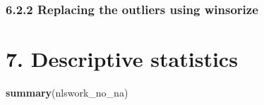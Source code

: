 \documentclass[
]{article}
\newenvironment{Shaded}{\begin{snugshade}}{\end{snugshade}}
\newcommand{\AttributeTok}[1]{\textcolor[rgb]{0.13,0.29,0.53}{#1}}
\newcommand{\DecValTok}[1]{\textcolor[rgb]{0.00,0.00,0.81}{#1}}
\newcommand{\FloatTok}[1]{\textcolor[rgb]{0.00,0.00,0.81}{#1}}
\newcommand{\FunctionTok}[1]{\textcolor[rgb]{0.13,0.29,0.53}{\textbf{#1}}}
\newcommand{\NormalTok}[1]{#1}
\newcommand{\OtherTok}[1]{\textcolor[rgb]{0.56,0.35,0.01}{#1}}
\newcommand{\SpecialCharTok}[1]{\textcolor[rgb]{0.81,0.36,0.00}{\textbf{#1}}}
\newcommand{\StringTok}[1]{\textcolor[rgb]{0.31,0.60,0.02}{#1}}
\begin{document}
\begin{Shaded}
\end{Shaded}

\hypertarget{replacing-the-outliers-using-winsorize}{%
\subsubsection{6.2.2 Replacing the outliers using
winsorize}\label{replacing-the-outliers-using-winsorize}}

\begin{Shaded}
\end{Shaded}

\hypertarget{descriptive-statistics}{%
\section{7. Descriptive statistics}\label{descriptive-statistics}}

\begin{Shaded}
\begin{Highlighting}[]
\FunctionTok{summary}\NormalTok{(nlswork\_no\_na) }
\end{Highlighting}
\end{Shaded}
\end{document}
